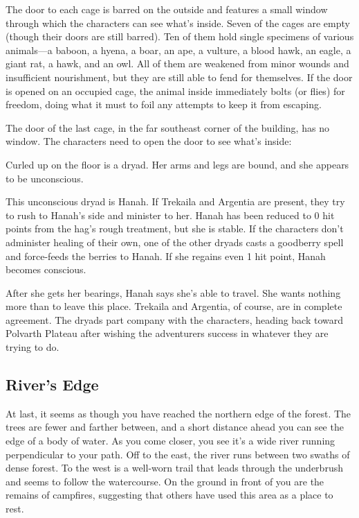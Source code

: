 \documentclass[10pt,a4paper,twoside,bg=print,twocolumn,openany,nodeprecatedcode]{dndbook}
\begin{document}
The door to each cage is barred on the outside and features a small window through which the characters can see what's inside. Seven of the cages are empty (though their doors are still barred). Ten of them hold single specimens of various animals—a baboon, a hyena, a boar, an ape, a vulture, a blood hawk, an eagle, a giant rat, a hawk, and an owl. All of them are weakened from minor wounds and insufficient nourishment, but they are still able to fend for themselves. If the door is opened on an occupied cage, the animal inside immediately bolts (or flies) for freedom, doing what it must to foil any attempts to keep it from escaping.

The door of the last cage, in the far southeast corner of the building, has no window. The characters need to open the door to see what's inside:

\begin{DndReadAloud}{}
Curled up on the floor is a dryad. Her arms and legs are bound, and she appears to be unconscious.

\end{DndReadAloud}

This unconscious dryad is Hanah. If Trekaila and Argentia are present, they try to rush to Hanah's side and minister to her. Hanah has been reduced to 0 hit points from the hag's rough treatment, but she is stable. If the characters don't administer healing of their own, one of the other dryads casts a goodberry spell and force-feeds the berries to Hanah. If she regains even 1 hit point, Hanah becomes conscious.

After she gets her bearings, Hanah says she's able to travel. She wants nothing more than to leave this place. Trekaila and Argentia, of course, are in complete agreement. The dryads part company with the characters, heading back toward Polvarth Plateau after wishing the adventurers success in whatever they are trying to do.

\subsection{River's Edge}
\begin{DndReadAloud}{}
At last, it seems as though you have reached the northern edge of the forest. The trees are fewer and farther between, and a short distance ahead you can see the edge of a body of water. As you come closer, you see it's a wide river running perpendicular to your path. Off to the east, the river runs between two swaths of dense forest. To the west is a well-worn trail that leads through the underbrush and seems to follow the watercourse. On the ground in front of you are the remains of campfires, suggesting that others have used this area as a place to rest.

\end{DndReadAloud}
\end{document}
